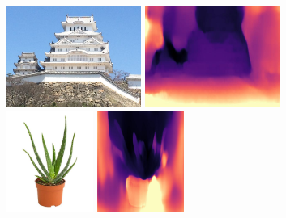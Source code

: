\documentclass[12pt, letterpaper]{article}
\begin{document}
\begin{figure}[!ht]
    \begin{center}
        \includegraphics[height = 3.3cm]{fe414_0000722049_1}
        \includegraphics[height = 3.3cm]{fe414_0000722049_1_disp}
        \includegraphics[height = 3.3cm]{jardins-du-senegal-aloe-vera-28830638178417_1200x1200}
        \includegraphics[height = 3.3cm]{jardins-du-senegal-aloe-vera-28830638178417_1200x1200_disp}


\end{center}
\end{figure}
\end{document}
